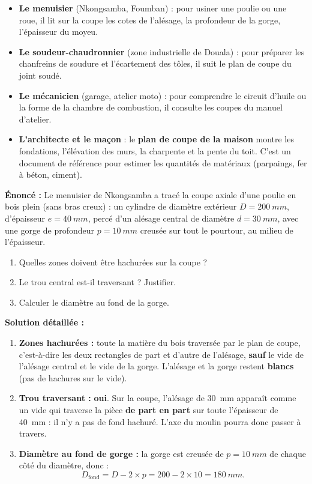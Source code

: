 \documentclass[11pt]{article}
\newcounter{popsec}
\newcounter{popsub}
\newcommand{\courssub}[1]{%
  \stepcounter{popsub}%
  \par\vspace{9pt}\noindent{\popxbold\fontsize{11.5}{13}\selectfont\color{popink}{\color{poporange}\thepopsec.\thepopsub}\hspace{6pt}#1}\par\nopagebreak\vspace{4pt}
}
\begin{document}
\courssub{Intérêt pratique : qui lit des coupes ?}

\begin{itemize}
\item \textbf{Le menuisier} (Nkongsamba, Foumban) : pour usiner une poulie ou une roue, il lit sur la coupe les cotes de l'alésage, la profondeur de la gorge, l'épaisseur du moyeu.
\item \textbf{Le soudeur-chaudronnier} (zone industrielle de Douala) : pour préparer les chanfreins de soudure et l'écartement des tôles, il suit le plan de coupe du joint soudé.
\item \textbf{Le mécanicien} (garage, atelier moto) : pour comprendre le circuit d'huile ou la forme de la chambre de combustion, il consulte les coupes du manuel d'atelier.
\item \textbf{L'architecte et le maçon} : le \textbf{plan de coupe de la maison} montre les fondations, l'élévation des murs, la charpente et la pente du toit. C'est un document de référence pour estimer les quantités de matériaux (parpaings, fer à béton, ciment).
\end{itemize}

\begin{exoresolu}
\textbf{Énoncé :} Le menuisier de Nkongsamba a tracé la coupe axiale d'une poulie en bois plein (sans bras creux) : un cylindre de diamètre extérieur $D = \SI{200}{mm}$, d'épaisseur $e = \SI{40}{mm}$, percé d'un alésage central de diamètre $d = \SI{30}{mm}$, avec une gorge de profondeur $p = \SI{10}{mm}$ creusée sur tout le pourtour, au milieu de l'épaisseur.
\begin{enumerate}
\item Quelles zones doivent être hachurées sur la coupe ?
\item Le trou central est-il traversant ? Justifier.
\item Calculer le diamètre au fond de la gorge.
\end{enumerate}
\tcblower
\textbf{Solution détaillée :}
\begin{enumerate}
\item \textbf{Zones hachurées :} toute la matière du bois traversée par le plan de coupe, c'est-à-dire les deux rectangles de part et d'autre de l'alésage, \textbf{sauf} le vide de l'alésage central et le vide de la gorge. L'alésage et la gorge restent \textbf{blancs} (pas de hachures sur le vide).
\item \textbf{Trou traversant :} \textbf{oui}. Sur la coupe, l'alésage de \SI{30}{mm} apparaît comme un vide qui traverse la pièce \textbf{de part en part} sur toute l'épaisseur de \SI{40}{mm} : il n'y a pas de fond hachuré. L'axe du moulin pourra donc passer à travers.
\item \textbf{Diamètre au fond de gorge :} la gorge est creusée de $p = \SI{10}{mm}$ de chaque côté du diamètre, donc :
\[ D_{\text{fond}} = D - 2 \times p = 200 - 2 \times 10 = \SI{180}{mm}. \]
\end{enumerate}
\end{exoresolu}
\end{document}
